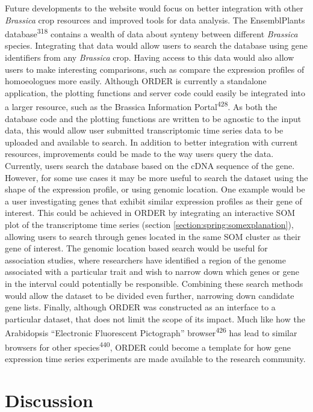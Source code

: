 \documentclass[12pt,]{book}
\begin{document}
Future developments to the website would focus on better integration
with other \emph{Brassica} crop resources and improved tools for data
analysis. The EnsemblPlants database\textsuperscript{318} contains a
wealth of data about synteny between different \emph{Brassica} species.
Integrating that data would allow users to search the database using
gene identifiers from any \emph{Brassica} crop. Having access to this
data would also allow users to make interesting comparisons, such as
compare the expression profiles of homoeologues more easily. Although
ORDER is currently a standalone application, the plotting functions and
server code could easily be integrated into a larger resource, such as
the Brassica Information Portal\textsuperscript{428}. As both the
database code and the plotting functions are written to be agnostic to
the input data, this would allow user submitted transcriptomic time
series data to be uploaded and available to search. In addition to
better integration with current resources, improvements could be made to
the way users query the data. Currently, users search the database based
on the cDNA sequence of the gene. However, for some use cases it may be
more useful to search the dataset using the shape of the expression
profile, or using genomic location. One example would be a user
investigating genes that exhibit similar expression profiles as their
gene of interest. This could be achieved in ORDER by integrating an
interactive SOM plot of the transcriptome time series (section
\ref{section:spring:somexplanation}), allowing users to search through
genes located in the same SOM cluster as their gene of interest. The
genomic location based search would be useful for association studies,
where researchers have identified a region of the genome associated with
a particular trait and wish to narrow down which genes or gene in the
interval could potentially be responsible. Combining these search
methods would allow the dataset to be divided even further, narrowing
down candidate gene lists. Finally, although ORDER was constructed as an
interface to a particular dataset, that does not limit the scope of its
impact. Much like how the Arabidopsis ``Electronic Fluorescent
Pictograph'' browser\textsuperscript{426} has lead to similar browsers
for other species\textsuperscript{440}, ORDER could become a template
for how gene expression time series experiments are made available to
the research community.

\chapter{Discussion}\label{chapter:discussion}
\end{document}
